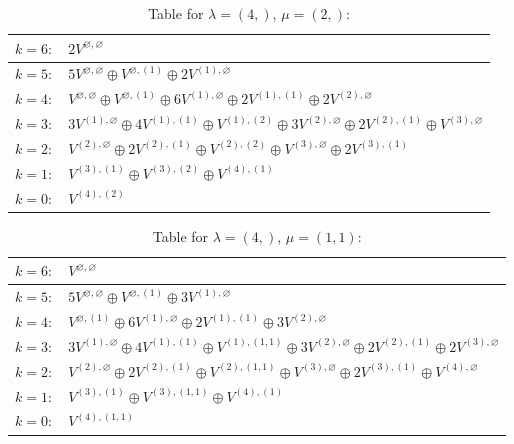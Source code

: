 \renewcommand{\arraystretch}{1.6} 
\begin{table}[H]
\centering
\caption{Table for $\lambda = (4,)$, $\mu = (2,)$:}
\begin{tabular}{|>{\centering\arraybackslash}p{15cm}|}
\hline
 $k = 6: \quad 2 V^{\varnothing, \varnothing} $ \\ \hline
 $k = 5: \quad 5 V^{\varnothing, \varnothing} \oplus V^{\varnothing, (1)} \oplus 2 V^{(1), \varnothing} $ \\ \hline
 $k = 4: \quad V^{\varnothing, \varnothing} \oplus V^{\varnothing, (1)} \oplus 6 V^{(1), \varnothing} \oplus 2 V^{(1), (1)} \oplus 2 V^{(2), \varnothing} $ \\ \hline
 $k = 3: \quad 3 V^{(1), \varnothing} \oplus 4 V^{(1), (1)} \oplus V^{(1), (2)} \oplus 3 V^{(2), \varnothing} \oplus 2 V^{(2), (1)} \oplus V^{(3), \varnothing} $ \\ \hline
 $k = 2: \quad V^{(2), \varnothing} \oplus 2 V^{(2), (1)} \oplus V^{(2), (2)} \oplus V^{(3), \varnothing} \oplus 2 V^{(3), (1)} $ \\ \hline
 $k = 1: \quad V^{(3), (1)} \oplus V^{(3), (2)} \oplus V^{(4), (1)} $ \\ \hline
 $k = 0: \quad V^{(4), (2)} $ \\ \hline
\end{tabular}
\end{table}

\renewcommand{\arraystretch}{1.6} 
\begin{table}[H]
\centering
\caption{Table for $\lambda = (4,)$, $\mu = (1, 1)$:}
\begin{tabular}{|>{\centering\arraybackslash}p{15cm}|}
\hline
 $k = 6: \quad V^{\varnothing, \varnothing} $ \\ \hline
 $k = 5: \quad 5 V^{\varnothing, \varnothing} \oplus V^{\varnothing, (1)} \oplus 3 V^{(1), \varnothing} $ \\ \hline
 $k = 4: \quad V^{\varnothing, (1)} \oplus 6 V^{(1), \varnothing} \oplus 2 V^{(1), (1)} \oplus 3 V^{(2), \varnothing} $ \\ \hline
 $k = 3: \quad 3 V^{(1), \varnothing} \oplus 4 V^{(1), (1)} \oplus V^{(1), (1, 1)} \oplus 3 V^{(2), \varnothing} \oplus 2 V^{(2), (1)} \oplus 2 V^{(3), \varnothing} $ \\ \hline
 $k = 2: \quad V^{(2), \varnothing} \oplus 2 V^{(2), (1)} \oplus V^{(2), (1, 1)} \oplus V^{(3), \varnothing} \oplus 2 V^{(3), (1)} \oplus V^{(4), \varnothing} $ \\ \hline
 $k = 1: \quad V^{(3), (1)} \oplus V^{(3), (1, 1)} \oplus V^{(4), (1)} $ \\ \hline
 $k = 0: \quad V^{(4), (1, 1)} $ \\ \hline
\end{tabular}
\end{table}

